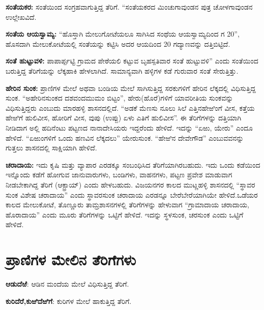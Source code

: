 \textbf{ಸಂತೆಯಕರ: } ಸಂತೆಯಿಂದ ಸಂಗ್ರಹವಾಗುತ್ತಿದ್ದ ತೆರಿಗೆ. “ಸಂತೆಯಕರದ ಮಿಂಚುಗಾವುಂಡನ ಪುತ್ರ ಚೋಳಗಾವುಂಡನ ಉಲ್ಲೇಖವಿದೆ.

\textbf{ಸಂತೆಯ ಆಯಸ್ವಾಮ್ಯ:} “ಹೊಸ್ತಾಗಿ ಮೇಲುಗೋಟೆಯಲೂ ಸಾಗಿಸಿದ ಸಂಥೆಯ ಆಯಸ್ವಾಮ್ಯದಿಂದ ಗ 20”, ಹೊಸದಾಗಿ ಮೇಲುಕೋಟೆಯಲ್ಲಿ ಸಂತೆಯನ್ನು ಕಟ್ಟಿಸಿ ಅದರ ಆಯದಿಂದ 20 ಗದ್ಯಾಣವನ್ನು ದತ್ತಿಬಿಟ್ಟಿದೆ.

\textbf{ಸಂತೆ ಹುಟ್ಟುವಳಿ: } ಪಾಪಾರ್ಪ್ಪಟ್ಟಿ ಗ್ರಾಮದ ಪೇಠೆಯಲಿ ಕಟ್ಟುವ ಬೃಹಸ್ಪತಿವಾರ ಸಂತೆ ಹುಟ್ಟುವಳಿ” ಎಂದು ಸಂತೆಯಿಂದ ಬರುತ್ತಿದ್ದ ತೆರಿಗೆಯನ್ನು ಲೆಕ್ಕಹಾಕಿ ಹೇಳಲಾಗಿದೆ. ಸಾಮಾನ್ಯವಾಗಿ ಹಳ್ಳಿಗಳ ಕಡೆ ಗುರುವಾರ ಸಂತೆ ಸೇರುತ್ತಿತ್ತು. 

\textbf{ಹೇರಿನ ಸುಂಕ:} ಪ್ರಾಣಿಗಳ ಮೇಲೆ ಅಥವಾ ಬಂಡಿಯ ಮೇಲೆ ಸಾಗಿಸುತ್ತಿದ್ದ ಸರಕುಗಳಿಗೆ ಹೇರಿನ ಲೆಕ್ಕದಲ್ಲಿ ವಿಧಿಸುತ್ತಿದ್ದ ಸುಂಕ. “ಅಹೇರಿನಸುಂಕದ ದಶವಂದಮುಮಂ ಬಿಟ್ಟಂ”, ಹೇರು(ಹೊರೆ)ಗಳಿಗೆ ಯಾವರೀತಿಯ ಸುಂಕವನ್ನು ವಿಧಿಸುತ್ತಿದ್ದರು ಎಂಬುದು ಮಾರಹಳ್ಳಿ ಶಾಸನದಲ್ಲಿದೆ. “ಅಡಕೆ ಮೆಣಸು ನೂಲು ಸಿಲೆ ಎತ್ತಿನಹೇಱಿಂಗೆ ವೀಸ, ಕತ್ತೆಯ ಹೇಱಿಗೆ ಹುಲಿವೀಸ, ಹೋರಿಗೆ ವೀಸ, ವುಪು (ಉಪ್ಪು) ಏಳು ಎತಿಗೆ ಹುಲಿವೀಸ”. ಈ ತೆರಿಗೆಗಳನ್ನು ದತ್ತಿಯಾಗಿ ನೀಡಿದಾಗ ಅಲ್ಲಿ ಹದಿನೆಂಟು ಪಟ್ಟಣದ ನಾನಾದೇಸಿಯರು ಇದ್ದರೆಂದು ಹೇಳಿದೆ. ಇದನ್ನು “ಏಱು, ಯೇರು” ಎಂದೂ ಹೇಳಿದೆ. “ಏಱುಂಗಳಿಗೆ ಒಂದು ಹಣವಿನ ಲೆಕ್ಕದಲು” ಯೇರುಸುಂಕ. “ಹೇಱಿನ ದೇವೇಗೌಡ” ಎಂಬುವವನನ್ನು ಗುತ್ತಲು ಶಾಸನದಲ್ಲಿ ಸಾಕ್ಷಿಯಾಗಿ ಹೇಳಿದೆ.

\textbf{ಚರಾದಾಯ: } ಇದು ಕೃಷಿ ಮತ್ತು ವ್ಯಾಪಾರ ಎರಡಕ್ಕೂ ಸಂಬಂಧಿಸಿದ ತೆರಿಗೆಯಾಗಿರಬಹುದು. ಇದು ಒಂದು ಕಡೆಯಿಂದ ಇನ್ನೊಂದು ಕಡೆಗೆ ಹೋಗುವ ಜಾನುವಾರುಗಳು, ಬಂಡಿಗಳು, ವಾಹನಗಳು, ಪಟ್ಟಣ ಪ್ರವೇಶ ಮಾಡುವಾಗ ನೀಡಬೇಕಾಗಿದ್ದ ತೆರಿಗೆ (ಆಕ್ಟ್ರಾಯ್​) ಎಂದು ಹೇಳಬಹುದು. ವಿಜಯನಗರ ಕಾಲದ ಮುಟ್ಣಹಳ್ಳಿ ಶಾಸನದಲ್ಲಿ “ಸ್ಥಾವರ ಸುಂಕ ವಿಶೇಷ ಚರಾದಾಯ” ಎಂದು ಸ್ಥಾವರಸುಂಕ ಚರಾದಾಯ ಎರಡನ್ನೂ ಬೇರೆಬೇರೆಯಾಗಿಯೇ ಹೇಳಿದೆ.ಒಡೆಯರ ಕಾಲದ ಮೇಲುಕೋಟೆ, ತೊಣ್ಣೂರು ತಾಮ್ರಶಾಸನಗಳಲ್ಲಿ ತೆರಿಗೆಗಳನ್ನು ಹೇಳುವಾಗ “ಗ್ರಾಮಾದಾಯ ಚರಾದಾಯ, ಹೊರಾದಾಯ” ಎಂದು ಮೂರು ತೆರಿಗೆಗಳನ್ನು ಒಟ್ಟಿಗೆ ಹೇಳಿದೆ. ಇದನ್ನು ಸ್ಥಳಸುಂಕ, ಚರಸುಂಕ ಎಂದು ಒಟ್ಟಿಗೆ ಹೇಳಿದೆ.


\section{ಪ್ರಾಣಿಗಳ ಮೇಲಿನ ತೆರಿಗೆಗಳು}

\textbf{ಆಡುದೆಱೆ}: ಆಡಿನ ಮಂದೆಯ ಮೇಲೆ ವಿಧಿಸುತ್ತಿದ್ದ ತೆರಿಗೆ.

\textbf{ಕುರಿದೆರೆ,}\textbf{ಕುಱಿದೆಱಿಗೆ}: ಕುರಿಗಳ ಮೇಲೆ ಹಾಕುತ್ತಿದ್ದ ತೆರಿಗೆ.

